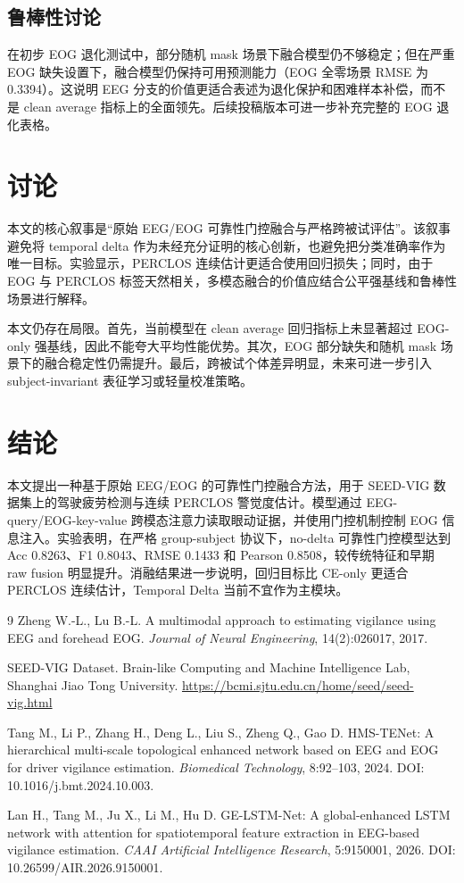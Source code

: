 \documentclass[UTF8,a4paper,10.5pt,fontset=windows]{ctexart}
\begin{document}
\subsection{鲁棒性讨论}
在初步 EOG 退化测试中，部分随机 mask 场景下融合模型仍不够稳定；但在严重 EOG 缺失设置下，融合模型仍保持可用预测能力（EOG 全零场景 RMSE 为 0.3394）。这说明 EEG 分支的价值更适合表述为退化保护和困难样本补偿，而不是 clean average 指标上的全面领先。后续投稿版本可进一步补充完整的 EOG 退化表格。

\section{讨论}
本文的核心叙事是“原始 EEG/EOG 可靠性门控融合与严格跨被试评估”。该叙事避免将 temporal delta 作为未经充分证明的核心创新，也避免把分类准确率作为唯一目标。实验显示，PERCLOS 连续估计更适合使用回归损失；同时，由于 EOG 与 PERCLOS 标签天然相关，多模态融合的价值应结合公平强基线和鲁棒性场景进行解释。

本文仍存在局限。首先，当前模型在 clean average 回归指标上未显著超过 EOG-only 强基线，因此不能夸大平均性能优势。其次，EOG 部分缺失和随机 mask 场景下的融合稳定性仍需提升。最后，跨被试个体差异明显，未来可进一步引入 subject-invariant 表征学习或轻量校准策略。

\section{结论}
本文提出一种基于原始 EEG/EOG 的可靠性门控融合方法，用于 SEED-VIG 数据集上的驾驶疲劳检测与连续 PERCLOS 警觉度估计。模型通过 EEG-query/EOG-key-value 跨模态注意力读取眼动证据，并使用门控机制控制 EOG 信息注入。实验表明，在严格 group-subject 协议下，no-delta 可靠性门控模型达到 Acc 0.8263、F1 0.8043、RMSE 0.1433 和 Pearson 0.8508，较传统特征和早期 raw fusion 明显提升。消融结果进一步说明，回归目标比 CE-only 更适合 PERCLOS 连续估计，Temporal Delta 当前不宜作为主模块。

\begin{thebibliography}{9}
Zheng W.-L., Lu B.-L. A multimodal approach to estimating vigilance using EEG and forehead EOG. \textit{Journal of Neural Engineering}, 14(2):026017, 2017.

SEED-VIG Dataset. Brain-like Computing and Machine Intelligence Lab, Shanghai Jiao Tong University. \url{https://bcmi.sjtu.edu.cn/home/seed/seed-vig.html}

Tang M., Li P., Zhang H., Deng L., Liu S., Zheng Q., Gao D. HMS-TENet: A hierarchical multi-scale topological enhanced network based on EEG and EOG for driver vigilance estimation. \textit{Biomedical Technology}, 8:92--103, 2024. DOI: 10.1016/j.bmt.2024.10.003.

Lan H., Tang M., Ju X., Li M., Hu D. GE-LSTM-Net: A global-enhanced LSTM network with attention for spatiotemporal feature extraction in EEG-based vigilance estimation. \textit{CAAI Artificial Intelligence Research}, 5:9150001, 2026. DOI: 10.26599/AIR.2026.9150001.
\end{thebibliography}
\end{document}
